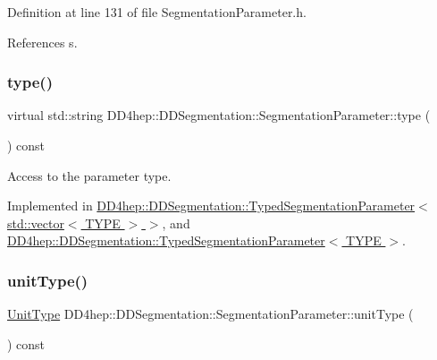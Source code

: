 Definition at line 131 of file Segmentation\+Parameter.\+h.



References s.

\hypertarget{class_d_d4hep_1_1_d_d_segmentation_1_1_segmentation_parameter_a761f142a3d6d7ecdbc200e97913af165}{}\label{class_d_d4hep_1_1_d_d_segmentation_1_1_segmentation_parameter_a761f142a3d6d7ecdbc200e97913af165} 
\subsubsection{\texorpdfstring{type()}{type()}}
{\footnotesize\ttfamily virtual std\+::string D\+D4hep\+::\+D\+D\+Segmentation\+::\+Segmentation\+Parameter\+::type (\begin{DoxyParamCaption}{ }\end{DoxyParamCaption}) const\hspace{0.3cm}{\ttfamily [pure virtual]}}



Access to the parameter type. 



Implemented in \hyperlink{class_d_d4hep_1_1_d_d_segmentation_1_1_typed_segmentation_parameter_3_01std_1_1vector_3_01_t_y_p_e_01_4_01_4_ae4f6da133bbd4b71b2593db7bf26824a}{D\+D4hep\+::\+D\+D\+Segmentation\+::\+Typed\+Segmentation\+Parameter$<$ std\+::vector$<$ T\+Y\+P\+E $>$ $>$}, and \hyperlink{class_d_d4hep_1_1_d_d_segmentation_1_1_typed_segmentation_parameter_a94048e5faa76978155f30389ed541bd9}{D\+D4hep\+::\+D\+D\+Segmentation\+::\+Typed\+Segmentation\+Parameter$<$ T\+Y\+P\+E $>$}.

\hypertarget{class_d_d4hep_1_1_d_d_segmentation_1_1_segmentation_parameter_ac3be3e721366e13e49d01cfc7ce965a4}{}\label{class_d_d4hep_1_1_d_d_segmentation_1_1_segmentation_parameter_ac3be3e721366e13e49d01cfc7ce965a4} 
\subsubsection{\texorpdfstring{unit\+Type()}{unitType()}}
{\footnotesize\ttfamily \hyperlink{class_d_d4hep_1_1_d_d_segmentation_1_1_segmentation_parameter_a36f5f8b8d812b2a2b81363377565d8d4}{Unit\+Type} D\+D4hep\+::\+D\+D\+Segmentation\+::\+Segmentation\+Parameter\+::unit\+Type (\begin{DoxyParamCaption}{ }\end{DoxyParamCaption}) const\hspace{0.3cm}{\ttfamily [inline]}}



